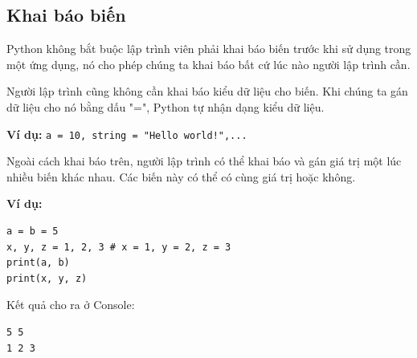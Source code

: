 \subsection{Khai báo biến}
Python không bắt buộc lập trình viên phải khai báo biến trước khi sử dụng trong một ứng dụng, nó cho phép chúng ta khai báo bất cứ lúc nào người lập trình cần.\par
Người lập trình cũng không cần khai báo kiểu dữ liệu cho biến. Khi chúng ta gán dữ liệu cho nó bằng dấu "=", Python tự nhận dạng kiểu dữ liệu.\par
\textbf{Ví dụ:} \texttt{a = 10, string = "Hello world!",...}\par
Ngoài cách khai báo trên, người lập trình có thể khai báo và gán giá trị một lúc nhiều biến khác nhau. Các biến này có thể có cùng giá trị hoặc không.\par
\textbf{Ví dụ:}\\
\begin{lstlisting}
a = b = 5
x, y, z = 1, 2, 3 # x = 1, y = 2, z = 3
print(a, b)
print(x, y, z)
\end{lstlisting}
Kết quả cho ra ở Console:\\
\begin{lstlisting}
5 5 
1 2 3
\end{lstlisting}
\newpage
